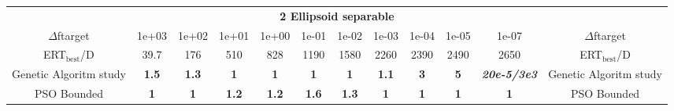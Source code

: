 \begin{tabular}{cccccccccccc}
 & \multicolumn{10}{c}{{\normalsize \textbf{2 Ellipsoid separable}}}\\
$\Delta$ftarget& 1e+03& 1e+02& 1e+01& 1e+00& 1e-01& 1e-02& 1e-03& 1e-04& 1e-05& 1e-07 & $\Delta$ftarget \\
ERT$_{\textrm{best}}$/D& 39.7& 176& 510& 828& 1190& 1580& 2260& 2390& 2490& 2650 & ERT$_{\textrm{best}}$/D \\
\hline
Genetic Algoritm study & \textbf{1.5} & \textbf{1.3} & \textbf{1} & \textbf{1} & \textbf{1} & \textbf{1} & \textbf{1.1} & \textbf{3} & \textbf{5} & \textbf{\textit{20e-5}\textit{/3e3}} & Genetic Algoritm study \cite{add_an_entry_for_Genetic Algoritm study_in_bbob.bib}\\
PSO Bounded & \textbf{1} & \textbf{1} & \textbf{1.2} & \textbf{1.2} & \textbf{1.6} & \textbf{1.3} & \textbf{1} & \textbf{1} & \textbf{1} & \textbf{1} & PSO Bounded \cite{add_an_entry_for_PSO Bounded_in_bbob.bib}
\end{tabular}
